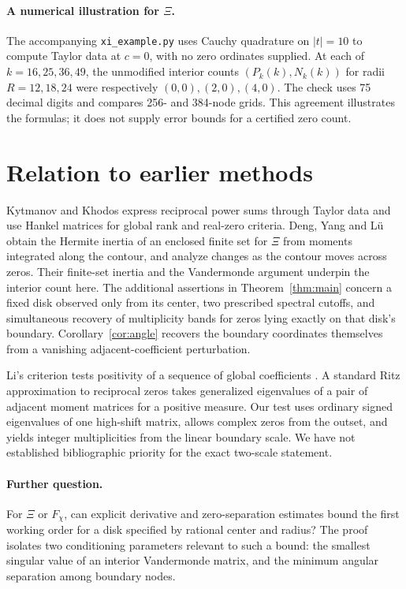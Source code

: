 \documentclass[11pt]{article}
\begin{document}
\paragraph{A numerical illustration for $\Xi$.}
The accompanying \texttt{xi\_example.py} uses Cauchy quadrature on $|t|=10$ to compute Taylor data at $c=0$, with no zero ordinates supplied. At each of $k=16,25,36,49$, the unmodified interior counts $(P_k(k),N_k(k))$ for radii $R=12,18,24$ were respectively $(0,0),(2,0),(4,0)$. The check uses 75 decimal digits and compares 256- and 384-node grids. This agreement illustrates the formulas; it does not supply error bounds for a certified zero count.

\section{Relation to earlier methods}
Kytmanov and Khodos \cite[Secs.~3--4]{kk} express reciprocal power sums through Taylor data and use Hankel matrices for global rank and real-zero criteria. Deng, Yang and L\"u \cite[Thm.~3.4]{dyl} obtain the Hermite inertia of an enclosed finite set for $\Xi$ from moments integrated along the contour, and analyze changes as the contour moves across zeros. Their finite-set inertia and the Vandermonde argument underpin the interior count here. The additional assertions in Theorem~\ref{thm:main} concern a fixed disk observed only from its center, two prescribed spectral cutoffs, and simultaneous recovery of multiplicity bands for zeros lying exactly on that disk's boundary. Corollary~\ref{cor:angle} recovers the boundary coordinates themselves from a vanishing adjacent-coefficient perturbation.

Li's criterion tests positivity of a sequence of global coefficients \cite{li}. A standard Ritz approximation to reciprocal zeros takes generalized eigenvalues of a pair of adjacent moment matrices for a positive measure. Our test uses ordinary signed eigenvalues of one high-shift matrix, allows complex zeros from the outset, and yields integer multiplicities from the linear boundary scale. We have not established bibliographic priority for the exact two-scale statement.

\paragraph{Further question.}
For $\Xi$ or $F_\chi$, can explicit derivative and zero-separation estimates bound the first working order for a disk specified by rational center and radius? The proof isolates two conditioning parameters relevant to such a bound: the smallest singular value of an interior Vandermonde matrix, and the minimum angular separation among boundary nodes.
\end{document}
